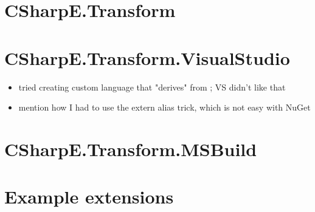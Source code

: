 \section{CSharpE.Transform}

\section{CSharpE.Transform.VisualStudio}

\begin{itemize}
\item tried creating custom language that "derives" from ; VS didn't like that
\item mention how I had to use the extern alias trick, which is not easy with NuGet
\end{itemize}

\section{CSharpE.Transform.MSBuild}

\section{Example extensions}
